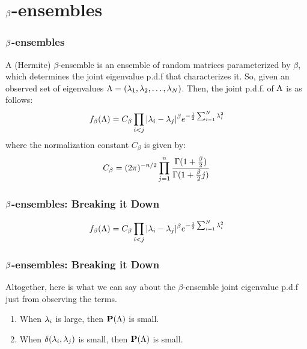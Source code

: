 

\section{$\b$-ensembles}

\begin{frame} \frametitle{$\b$-ensembles}

\begin{alertblock}{}
A (Hermite) $\beta$-ensemble is an ensemble of random matrices parameterized by $\beta$, which determines the joint eigenvalue p.d.f that characterizes it.
So, given an observed set of eigenvalues $\L = (\seqo[N]{\lambda})$. Then, the joint p.d.f. of $\L$ is as follows:
\begin{align*}
\jepdf = C_\beta \prod_{i < j} |\lambda_i - \lambda_j|^\beta e^{-\frac{1}{2} \sum_{i=1}^N \lambda_i^2}
\end{align*}
where the normalization constant $C_\beta$ is given by:
\begin{align*}
C_{\beta} = (2\pi)^{-n/2} \prod_{j = 1}^n \frac{\Gamma(1 + \frac{\b}{2})}{\Gamma(1 + \frac{\b}{2}j)}
\end{align*}
\end{alertblock}

\end{frame}
\begin{frame} \frametitle{$\b$-ensembles: Breaking it Down}
  \begin{align*}
  \jepdf = C_\beta \prod_{i < j} |\lambda_i - \lambda_j|^\beta e^{-\frac{1}{2} \sum_{i=1}^N \lambda_i^2}
  \end{align*}
\end{frame}
\begin{frame} \frametitle{$\b$-ensembles: Breaking it Down}
  Altogether, here is what we can say about the $\beta$-ensemble joint eigenvalue p.d.f just from observing the terms.
    \begin{enumerate}
      \item When $\l_i$ is large, then $\P(\L)$ is small.
      \item When $\d(\l_i, \l_j)$ is small, then $\P(\L)$ is small.
    \end{enumerate}
\end{frame}
